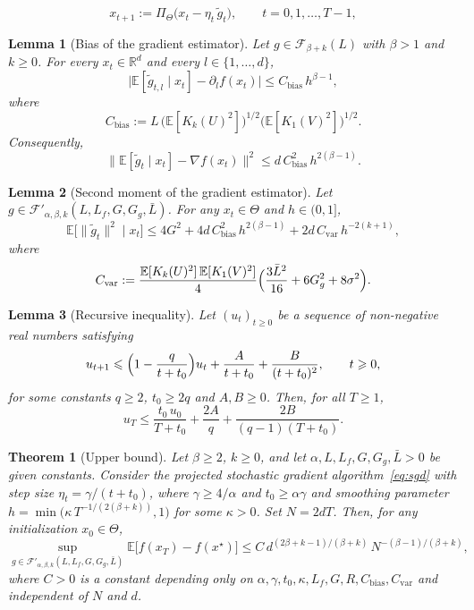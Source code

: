 \documentclass[10pt,a4paper]{amsart}
\newtheorem{lemma}{Lemma}
\newtheorem{theorem}{Theorem}
\renewcommand{\ge}{\geqslant}
\renewcommand{\geq}{\geqslant}
\renewcommand{\hat}{\widehat}
\renewcommand{\leq}{\leqslant}
\begin{document}
\begin{equation}
\label{eq:sgd}
x_{t+1}:=\Pi_\Theta\bigl(x_t-\eta_t\,\tilde{g}_t\bigr),
\qquad t=0,1,\dots,T-1,
\end{equation}

\begin{lemma}[Bias of the gradient estimator]
\label{lem:bias-multi}
Let $g\in\mathcal{F}_{\beta+k}(L)$ with $\beta>1$ and $k\geq 0$. 
For every $x_t\in\mathbb{R}^d$ and every $l\in\{1,\dots,d\}$,
\[
\bigl|\mathbb{E}[\tilde{g}_{t,l}\mid x_t]-\partial_l f(x_t)\bigr|
\leq C_{\mathrm{bias}}\,h^{\beta-1},
\]
where 
\[
C_{\mathrm{bias}}
:=L\,\bigl(\mathbb{E}[K_k(U)^2]\bigr)^{1/2}
\bigl(\mathbb{E}[K_1(V)^2]\bigr)^{1/2}.
\]
Consequently,
\[
\bigl\|\mathbb{E}[\tilde{g}_t\mid x_t]-\nabla f(x_t)\bigr\|^2
\leq d\,C_{\mathrm{bias}}^2\,h^{2(\beta-1)}.
\]
\end{lemma}

\begin{lemma}[Second moment of the gradient estimator]
\label{lem:var-multi-second-moment}
Let $g\in\mathcal{F}'_{\alpha,\beta,k}(L,L_f,G,G_g,\bar{L})$. For 
any $x_t\in\Theta$ and $h\in(0,1]$,
\[
\mathbb{E}\bigl[\|\tilde{g}_t\|^2\mid x_t\bigr]
\leq 4G^2+4d\,C_{\mathrm{bias}}^2\,h^{2(\beta-1)}
+2d\,C_{\mathrm{var}}\,h^{-2(k+1)},
\]
where 
\[
C_{\mathrm{var}}
:=\frac{\mathbb{E}[K_k(U)^2]\,\mathbb{E}[K_1(V)^2]}{4}
\Bigl(\frac{3\bar{L}^2}{16}+6G_g^2+8\sigma^2\Bigr).
\]
\end{lemma}

\begin{lemma}[Recursive inequality]
\label{lem:recursion}
Let $(u_t)_{t\geq 0}$ be a sequence of non-negative real numbers 
satisfying
\begin{equation}
\label{eq:recursion-hypo}
u_{t+1}\leq\Bigl(1-\frac{q}{t+t_0}\Bigr)u_t
+\frac{A}{t+t_0}+\frac{B}{(t+t_0)^2},\qquad t\geq 0,
\end{equation}
for some constants $q\geq 2$, $t_0\geq 2q$ and $A,B\geq 0$. Then, 
for all $T\geq 1$,
\begin{equation}
\label{eq:recursion-conclusion}
u_T\leq\frac{t_0\,u_0}{T+t_0}+\frac{2A}{q}
+\frac{2B}{(q-1)(T+t_0)}.
\end{equation}
\end{lemma}

\begin{theorem}[Upper bound]
\label{thm:upper-bound}
Let $\beta\ge 2$, $k\geq 0$, and let $\alpha,L,L_f,G,G_g,\bar{L}>0$ 
be given constants. Consider the projected stochastic gradient 
algorithm~\eqref{eq:sgd} with step size $\eta_t=\gamma/(t+t_0)$, 
where $\gamma\geq 4/\alpha$ and $t_0\geq\alpha\gamma$ and smoothing
parameter $h=\min\bigl(\kappa\,T^{-1/(2(\beta+k))},1\bigr)$ for 
some $\kappa>0$. Set $N=2dT$. Then, for any initialization 
$x_0\in\Theta$,
\[
\sup_{g\in\mathcal{F}'_{\alpha,\beta,k}(L,L_f,G,G_g,\bar{L})}
\mathbb{E}\bigl[f(x_T)-f(x^\star)\bigr]
\leq C\,d^{(2\beta+k-1)/(\beta+k)}\,N^{-(\beta-1)/(\beta+k)},
\]
where $C>0$ is a constant depending only on 
$\alpha,\gamma,t_0,\kappa,L_f,G,R,C_{\mathrm{bias}},C_{\mathrm{var}}$ 
and independent of $N$ and $d$. %
\end{theorem}
\end{document}
